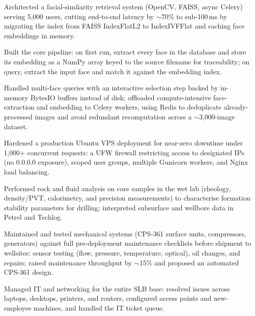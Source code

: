 \begin{details}
    \item Architected a facial-similarity retrieval system (OpenCV, FAISS, async Celery) serving 5{,}000 users, cutting end-to-end latency by $\sim$70\% to sub-100\,ms by migrating the index from FAISS IndexFlatL2 to IndexIVFFlat and caching face embeddings in memory.
    \item Built the core pipeline: on first run, extract every face in the database and store its embedding as a NumPy array keyed to the source filename for traceability; on query, extract the input face and match it against the embedding index.
    \item Handled multi-face queries with an interactive selection step backed by in-memory BytesIO buffers instead of disk; offloaded compute-intensive face-extraction and embedding to Celery workers, using Redis to deduplicate already-processed images and avoid redundant recomputation across a $\sim$3{,}000-image dataset.
    \item Hardened a production Ubuntu VPS deployment for near-zero downtime under 1{,}000+ concurrent requests: a UFW firewall restricting access to designated IPs (no 0.0.0.0 exposure), scoped user groups, multiple Gunicorn workers, and Nginx load balancing.
\end{details}

\begin{details}
    \item Performed rock and fluid analysis on core samples in the wet lab (rheology, density/PVT, calorimetry, and precision measurements) to characterise formation stability parameters for drilling; interpreted subsurface and wellbore data in Petrel and Techlog.
    \item Maintained and tested mechanical systems (CPS-361 surface units, compressors, generators) against full pre-deployment maintenance checklists before shipment to wellsites: sensor testing (flow, pressure, temperature, optical), oil changes, and repairs; raised maintenance throughput by $\sim$15\% and proposed an automated CPS-361 design.
    \item Managed IT and networking for the entire SLB base: resolved issues across laptops, desktops, printers, and routers, configured access points and new-employee machines, and handled the IT ticket queue.
\end{details}

